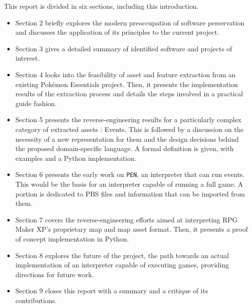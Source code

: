 \documentclass[11pt]{article}
\begin{document}
This report is divided in six sections, including this introduction.

\begin{itemize}
	\item Section 2 briefly explores the modern preoccupation of software perservation and discusses the application of its principles to the current project.
	
	\item Section 3 gives a detailed summary of identified software and projects of interest.
	
	\item Section 4 looks into the feasibility of asset and feature extraction from an existing Pokémon Essentials project. Then, it presents the implementation results of the extraction process and details the steps involved in a practical guide fashion.
	
	\item Section 5 presents the reverse-engineering results for a particularly complex category of extracted assets : Events. This is followed by a discussion on the necessity of a new representation for them and the design decisions behind the proposed domain-specific language. A formal definition is given, with examples and a Python implementation.
	
	\item Section 6 presents the early work on \texttt{PEN}, an interpreter that can run events. This would be the basis for an interpreter capable of running a full game. A portion is dedicated to PBS files and information that can be imported from them.
	
	\item Section 7 covers the reverse-engineering efforts aimed at interpreting RPG Maker XP's proprietary map and map asset format. Then, it presents a proof of concept implementation in Python.
	
	\item Section 8 explores the future of the project, the path towards an actual implementation of an interpreter capable of executing games, providing directions for future work.
	
	\item Section 9 closes this report with a summary and a critique of its contributions.
\end{itemize}







\newpage
\end{document}
